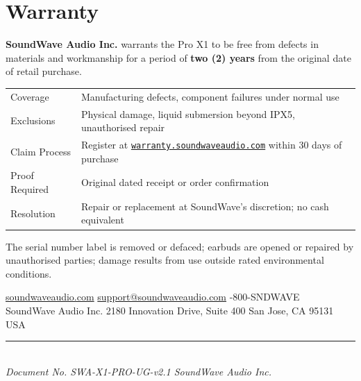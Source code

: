 \section{Warranty}

\textbf{SoundWave Audio Inc.} warrants the Pro X1 to be free from defects in materials and
workmanship for a period of \textbf{two (2) years} from the original date of retail purchase.

\begin{tabularx}{\linewidth}{@{}K@{\hspace{8mm}}>{\raggedright\arraybackslash}X@{}}
\setlength{\parskip}{0pt}%
Coverage          & Manufacturing defects, component failures under normal use \\
Exclusions        & Physical damage, liquid submersion beyond IPX5, unauthorised repair \\
Claim Process     & Register at \href{https://warranty.soundwaveaudio.com}{\texttt{warranty.soundwaveaudio.com}} within 30 days of purchase \\
Proof Required    & Original dated receipt or order confirmation \\
Resolution        & Repair or replacement at SoundWave's discretion; no cash equivalent \\
\end{tabularx}

\vspace{6pt}

\begin{warningbox}[title={\faExclamationCircle\enspace\textbf{Warranty Void If}}]
  The serial number label is removed or defaced; earbuds are opened or repaired by
  unauthorised parties; damage results from use outside rated environmental conditions.
\end{warningbox}

\vspace{10pt}

\begin{center}
  \small\color{neutral}
  \faGlobeAmericas\enspace\href{https://soundwaveaudio.com}{soundwaveaudio.com}\quad
  \faEnvelope\enspace\href{mailto:support@soundwaveaudio.com}{support@soundwaveaudio.com}\quad
  \faPhone{}-800-SNDWAVE\\[4pt]
  SoundWave Audio Inc. \textperiodcentered{} 2180 Innovation Drive, Suite 400 \textperiodcentered{} San Jose, CA 95131 \textperiodcentered{} USA\\[6pt]
  \textcolor{rulecolor}{\rule{80mm}{0.4pt}}\\[4pt]
  \textit{Document No. SWA-X1-PRO-UG-v2.1 \textperiodcentered{} \faCopyright{} SoundWave Audio Inc.}
\end{center}
